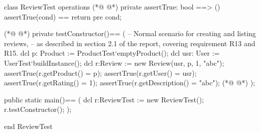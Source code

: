 \begin{vdmpp}[breaklines=true]
class ReviewTest
 operations
(*@
\label{assertTrue:3}
@*)
  private assertTrue: bool ==> ()
    assertTrue(cond) == return
    pre cond;
    
(*@
\label{testConstructor:7}
@*)
  private testConstructor()==
  (
    -- Normal scenario for creating and listing reviews,
     -- as described in section 2.1 of the report, covering requirement R13 and R15.
   dcl p: Product := ProductTest`emptyProduct();
   dcl usr: User := UserTest`buildInstance();
   dcl r:Review := new Review(usr, p, 1, "abc");
   assertTrue(r.getProduct() = p);
   assertTrue(r.getUser() = usr);
   assertTrue(r.getRating() = 1);
   assertTrue(r.getDescription() = "abc");
(*@
\label{main:18}
@*)
  );
  
  public static main()==
    (
   dcl r:ReviewTest := new ReviewTest();
   r.testConstructor();
    );
  
end ReviewTest
\end{vdmpp}
